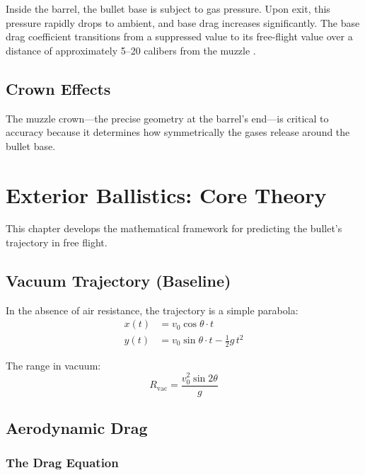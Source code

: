 \documentclass[11pt,twoside,openright]{report}
\begin{document}
Inside the barrel, the bullet base is subject to gas pressure. Upon exit, this pressure rapidly drops to ambient, and base drag increases significantly. The base drag coefficient transitions from a suppressed value to its free-flight value over a distance of approximately 5--20 calibers from the muzzle \citep{mccoy1999modern}.

\section{Crown Effects}

The muzzle crown---the precise geometry at the barrel's end---is critical to accuracy because it determines how symmetrically the gases release around the bullet base.


\chapter{Exterior Ballistics: Core Theory}
\label{ch:exterior}

This chapter develops the mathematical framework for predicting the bullet's trajectory in free flight.

\section{Vacuum Trajectory (Baseline)}

In the absence of air resistance, the trajectory is a simple parabola:
\begin{align}
  x(t) &= v_0 \cos\theta \cdot t \label{eq:vac_x}\\
  y(t) &= v_0 \sin\theta \cdot t - \frac{1}{2}g\,t^2 \label{eq:vac_y}
\end{align}

The range in vacuum:
\begin{equation}
  R_{\mathrm{vac}} = \frac{v_0^2 \sin 2\theta}{g}
  \label{eq:vac_range}
\end{equation}

\section{Aerodynamic Drag}

\subsection{The Drag Equation}
\end{document}
